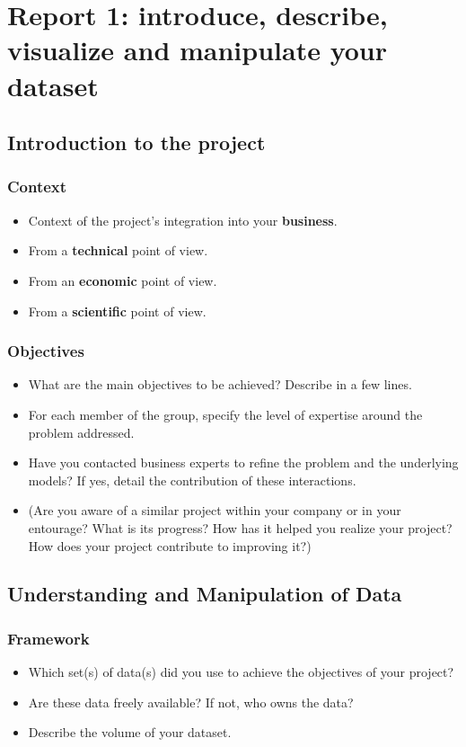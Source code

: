 \chapter{Report 1: introduce, describe, visualize and manipulate your dataset}

\section{Introduction to the project}
\subsection*{Context}
\begin{itemize}[label=\textbullet]
    \item Context of the project's integration into your \textbf{business}.
    \item From a \textbf{technical} point of view.
    \item From an \textbf{economic} point of view.
    \item From a \textbf{scientific} point of view.
\end{itemize}

\subsection*{Objectives}
\begin{itemize}[label=\textbullet]
    \item What are the main objectives to be achieved? Describe in a few lines.
    \item For each member of the group, specify the level of expertise around the problem addressed.
    \item Have you contacted business experts to refine the problem and the underlying models? If yes, detail the contribution of these interactions.
    \item (Are you aware of a similar project within your company or in your entourage? What is its progress? How has it helped you realize your project? How does your project contribute to improving it?)
\end{itemize}

\section{Understanding and Manipulation of Data}

\subsection*{Framework}
\begin{itemize}[label=\textbullet]
    \item Which set(s) of data(s) did you use to achieve the objectives of your project?
    \item Are these data freely available? If not, who owns the data?
    \item Describe the volume of your dataset.
\end{itemize}

